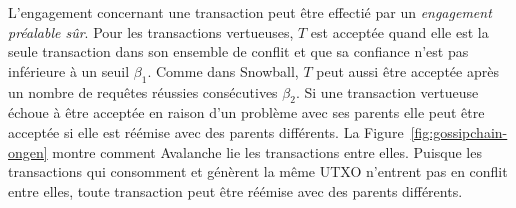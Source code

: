 
L'engagement concernant une transaction peut être effectié par un \emph{engagement préalable sûr}. Pour les transactions vertueuses, $T$ est acceptée quand elle est la seule transaction dans son ensemble de conflit et que sa confiance n'est pas inférieure à un seuil $\beta_1$.
Comme dans Snowball, $T$ peut aussi être acceptée après un nombre de requêtes réussies consécutives $\beta_2$.
Si une transaction vertueuse échoue à être acceptée en raison d'un problème avec ses parents elle peut être acceptée si elle est réémise avec des parents différents.
La Figure~\ref{fig:gossipchain-ongen} montre comment Avalanche lie les transactions entre elles. Puisque les transactions qui consomment et génèrent la même UTXO n'entrent pas en conflit entre elles, toute transaction peut être réémise avec des parents différents.

